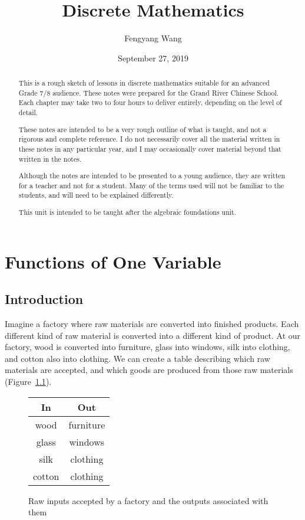 \documentclass[a4paper,10pt]{report}
\title{Discrete Mathematics}
\author{Fengyang Wang}
\date{September 27, 2019}
\begin{document}
\begin{abstract}
 This is a rough sketch of lessons in discrete mathematics suitable for an advanced Grade
 7/8 audience. These notes were prepared for the Grand River Chinese School. Each chapter
 may take two to four hours to deliver entirely, depending on the level of detail.

 These notes are intended to be a very rough outline of what is taught, and not a rigorous
 and complete reference. I do not necessarily cover all the material written in these notes
 in any particular year, and I may occasionally cover material beyond that written in the
 notes.

 Although the notes are intended to be presented to a young audience, they are written for a
 teacher and not for a student. Many of the terms used will not be familiar to the students,
 and will need to be explained differently.

 This unit is intended to be taught after the algebraic foundations unit.
\end{abstract}

\maketitle

\tableofcontents

\chapter{Functions of One Variable}

\section{Introduction}

Imagine a factory where raw materials are converted into finished products.
Each different kind of raw material is converted into a different kind of
product. At our factory, wood is converted into furniture, glass into windows,
silk into clothing, and cotton also into clothing. We can create a table
describing which raw materials are accepted, and which goods are produced from
those raw materials (Figure~\ref{fov:factory}).

\begin{figure}
 \renewcommand{\arraystretch}{1.2}
 \begin{tabular}{|c|c|}
  \hline
  \textbf{In} & \textbf{Out} \\
  \hline
  wood & furniture \\
  glass & windows \\
  silk & clothing \\
  cotton & clothing \\
  \hline
 \end{tabular}

 \caption{Raw inputs accepted by a factory and the outputs associated with
 them}
 \label{fov:factory}
\end{figure}
\end{document}
